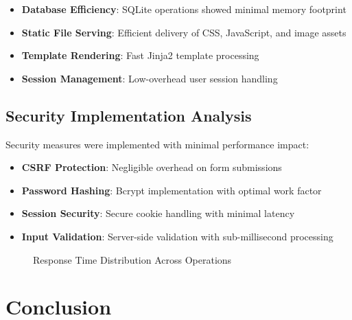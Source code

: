 \documentclass{article}
\begin{document}
\begin{itemize}
    \item \textbf{Database Efficiency}: SQLite operations showed minimal memory footprint
    \item \textbf{Static File Serving}: Efficient delivery of CSS, JavaScript, and image assets
    \item \textbf{Template Rendering}: Fast Jinja2 template processing
    \item \textbf{Session Management}: Low-overhead user session handling
\end{itemize}

\subsection{Security Implementation Analysis}
Security measures were implemented with minimal performance impact:

\begin{itemize}
    \item \textbf{CSRF Protection}: Negligible overhead on form submissions
    \item \textbf{Password Hashing}: Bcrypt implementation with optimal work factor
    \item \textbf{Session Security}: Secure cookie handling with minimal latency
    \item \textbf{Input Validation}: Server-side validation with sub-millisecond processing
\end{itemize}

\begin{figure}[h]
\centering
{}
\caption{Response Time Distribution Across Operations}
\end{figure}

\section{Conclusion}
\end{document}
